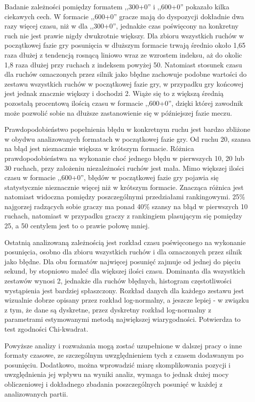 \documentclass[inzynierska]{pwr_wmat_praca_dyplomowa}
\theoremstyle{plain}
\numberwithin{theorem}{chapter}
\theoremstyle{definition}
\numberwithin{theorem}{chapter}
\begin{document}
Badanie zależności pomiędzy formatem ,,300+0'' i ,,600+0'' pokazało kilka ciekawych cech. W formacie ,,600+0'' gracze mają do dyspozycji dokładnie dwa razy więcej czasu, niż w dla ,,300+0'', jednakże czas poświęcony na konkretny ruch nie jest prawie nigdy dwukrotnie większy. Dla zbioru wszystkich ruchów w początkowej fazie gry posunięcia w dłuższym formacie trwają średnio około 1,65 raza dłużej z tendencją rosnącą liniowo wraz ze wzrostem indeksu, aż do okolic 1,8 raza dłużej przy ruchach z indeksem powyżej 50. Natomiast stosunek czasu dla ruchów oznaczonych przez silnik jako błędne zachowuje podobne wartości do zestawu wszystkich ruchów w początkowej fazie gry, w przypadku gry końcowej jest jednak znacznie większy i dochodzi 2. Wiąże się to z większą średnią pozostałą procentową ilością czasu w formacie ,,600+0'', dzięki której zawodnik może pozwolić sobie na dłuższe zastanowienie się w późniejszej fazie meczu.

Prawdopodobieństwo popełnienia błędu w konkretnym ruchu jest bardzo zbliżone w obydwu analizowanych formatach w początkowej fazie gry. Od ruchu 20, szansa na błąd jest nieznacznie większa w krótszym formacie. Różnica prawdopodobieństwa na wykonanie choć jednego błędu w pierwszych 10, 20 lub 30 ruchach, przy założeniu niezależności ruchów jest mała. Mimo większej ilości czasu w formacie ,,600+0'', błędów w początkowej fazie gry pojawia się statystycznie nieznacznie więcej niż w krótszym formacie. Znacząca różnica jest natomiast widoczna pomiędzy poszczególnymi przedziałami rankingowymi. 25\% najgorzej radzących sobie graczy ma ponad 40\% szansy na błąd w pierwszych 10 ruchach, natomiast w przypadku graczy z rankingiem plasującym się pomiędzy 25, a 50 centylem jest to o prawie połowę mniej.

Ostatnią analizowaną zależnością jest rozkład czasu poświęconego na wykonanie posunięcia, osobno dla zbioru wszystkich ruchów i dla oznaczonych przez silnik jako błędne. Dla obu formatów najwięcej posunięć zajmuje od jednej do pięciu sekund, by stopniowo maleć dla większej ilości czasu. Dominanta dla wszystkich zestawów wynosi 2, jednakże dla ruchów błędnych, histogram częstotliwości wystąpienia jest bardziej spłaszczony. Rozkład danych dla każdego zestawu jest wizualnie dobrze opisany przez rozkład log-normalny, a jeszcze lepiej - w związku z tym, że dane są dyskretne, przez dyskretny rozkład log-normalny z parametrami estymowanymi metodą największej wiarygodności. Potwierdza to test zgodności Chi-kwadrat.

Powyższe analizy i rozważania mogą zostać uzupełnione w dalszej pracy o inne formaty czasowe, ze szczególnym uwzględnieniem tych z czasem dodawanym po posunięciu. Dodatkowo, można wprowadzić miarę skomplikowania pozycji i uwzględnienia jej wpływu na wyniki analiz, wymaga to jednak dużej mocy obliczeniowej i dokładnego zbadania poszczególnych posunięć w każdej z analizowanych partii.
\end{document}
